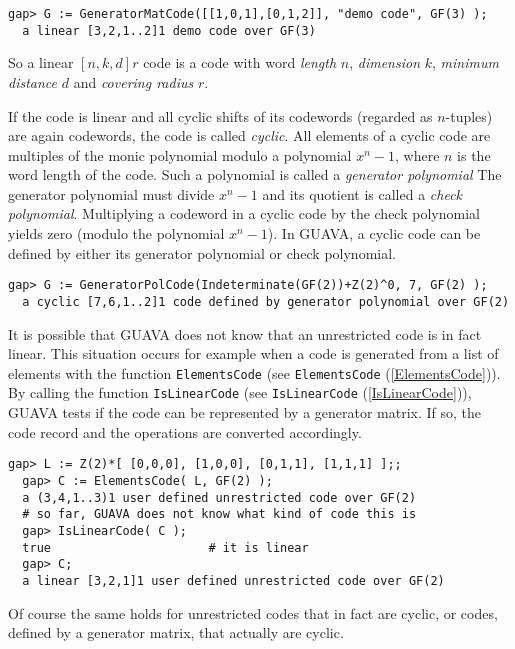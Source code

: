 \documentclass[11pt]{report}
\begin{document}
{\begin{Verbatim}[fontsize=\small,frame=single,label=Example]
  gap> G := GeneratorMatCode([[1,0,1],[0,1,2]], "demo code", GF(3) );
  a linear [3,2,1..2]1 demo code over GF(3) 
\end{Verbatim}
 So a linear $[n, k, d]r$ code  is a code with word \emph{length} $n$, \emph{dimension} $k$, \emph{minimum distance} $d$ and \emph{covering radius} $r$. 

 If the code is linear and all cyclic shifts of its codewords (regarded as $n$-tuples) are again codewords, the code is called \emph{cyclic}.  All elements of a cyclic code are multiples of the monic polynomial modulo a
polynomial $x^n -1$, where $n$ is the word length of the code. Such a polynomial is called a \emph{generator polynomial}  The generator polynomial must divide $x^n-1$ and its quotient is called a \emph{check polynomial}.  Multiplying a codeword in a cyclic code by the check polynomial yields zero
(modulo the polynomial $x^n -1$). In \textsf{GUAVA}, a cyclic code can be defined by either its generator polynomial or check
polynomial. 
\begin{Verbatim}[fontsize=\small,frame=single,label=Example]
  gap> G := GeneratorPolCode(Indeterminate(GF(2))+Z(2)^0, 7, GF(2) );
  a cyclic [7,6,1..2]1 code defined by generator polynomial over GF(2)
\end{Verbatim}
 It is possible that \textsf{GUAVA} does not know that an unrestricted code is in fact linear. This situation
occurs for example when a code is generated from a list of elements with the
function \texttt{ElementsCode} (see \texttt{ElementsCode} (\ref{ElementsCode})). By calling the function \texttt{IsLinearCode} (see \texttt{IsLinearCode} (\ref{IsLinearCode})), \textsf{GUAVA} tests if the code can be represented by a generator matrix. If so, the code
record and the operations are converted accordingly. 
\begin{Verbatim}[fontsize=\small,frame=single,label=Example]
  gap> L := Z(2)*[ [0,0,0], [1,0,0], [0,1,1], [1,1,1] ];;
  gap> C := ElementsCode( L, GF(2) );
  a (3,4,1..3)1 user defined unrestricted code over GF(2)
  # so far, GUAVA does not know what kind of code this is
  gap> IsLinearCode( C );
  true                      # it is linear
  gap> C;
  a linear [3,2,1]1 user defined unrestricted code over GF(2) 
\end{Verbatim}
  Of course the same holds for unrestricted codes that in fact are cyclic, or
codes, defined by a generator matrix, that actually are cyclic. 

}
\end{document}

